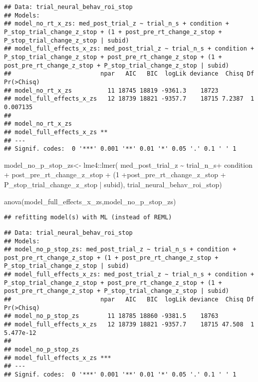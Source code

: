 \documentclass[
]{article}
\newenvironment{Shaded}{\begin{snugshade}}{\end{snugshade}}
\newcommand{\DecValTok}[1]{\textcolor[rgb]{0.00,0.00,0.81}{#1}}
\newcommand{\FunctionTok}[1]{\textcolor[rgb]{0.00,0.00,0.00}{#1}}
\newcommand{\NormalTok}[1]{#1}
\newcommand{\OtherTok}[1]{\textcolor[rgb]{0.56,0.35,0.01}{#1}}
\newcommand{\SpecialCharTok}[1]{\textcolor[rgb]{0.00,0.00,0.00}{#1}}
\begin{document}
\begin{verbatim}
## Data: trial_neural_behav_roi_stop
## Models:
## model_no_rt_x_zs: med_post_trial_z ~ trial_n_s + condition + P_stop_trial_change_z_stop + (1 + post_pre_rt_change_z_stop + P_stop_trial_change_z_stop | subid)
## model_full_effects_x_zs: med_post_trial_z ~ trial_n_s + condition + P_stop_trial_change_z_stop + post_pre_rt_change_z_stop + (1 + post_pre_rt_change_z_stop + P_stop_trial_change_z_stop | subid)
##                         npar   AIC   BIC  logLik deviance  Chisq Df Pr(>Chisq)
## model_no_rt_x_zs          11 18745 18819 -9361.3    18723                     
## model_full_effects_x_zs   12 18739 18821 -9357.7    18715 7.2387  1   0.007135
##                           
## model_no_rt_x_zs          
## model_full_effects_x_zs **
## ---
## Signif. codes:  0 '***' 0.001 '**' 0.01 '*' 0.05 '.' 0.1 ' ' 1
\end{verbatim}

\begin{Shaded}
\begin{Highlighting}[]
\NormalTok{model\_no\_p\_stop\_zs}\OtherTok{\textless{}{-}}\NormalTok{ lme4}\SpecialCharTok{::}\FunctionTok{lmer}\NormalTok{(}
\NormalTok{   med\_post\_trial\_z }\SpecialCharTok{\textasciitilde{}}\NormalTok{ trial\_n\_s}\SpecialCharTok{+}\NormalTok{ condition }\SpecialCharTok{+}\NormalTok{ post\_pre\_rt\_change\_z\_stop }\SpecialCharTok{+}\NormalTok{ (}\DecValTok{1} \SpecialCharTok{+}\NormalTok{post\_pre\_rt\_change\_z\_stop  }\SpecialCharTok{+}\NormalTok{ P\_stop\_trial\_change\_z\_stop  }\SpecialCharTok{|}\NormalTok{ subid),}
\NormalTok{  trial\_neural\_behav\_roi\_stop)}

\FunctionTok{anova}\NormalTok{(model\_full\_effects\_x\_zs,model\_no\_p\_stop\_zs)}
\end{Highlighting}
\end{Shaded}

\begin{verbatim}
## refitting model(s) with ML (instead of REML)
\end{verbatim}

\begin{verbatim}
## Data: trial_neural_behav_roi_stop
## Models:
## model_no_p_stop_zs: med_post_trial_z ~ trial_n_s + condition + post_pre_rt_change_z_stop + (1 + post_pre_rt_change_z_stop + P_stop_trial_change_z_stop | subid)
## model_full_effects_x_zs: med_post_trial_z ~ trial_n_s + condition + P_stop_trial_change_z_stop + post_pre_rt_change_z_stop + (1 + post_pre_rt_change_z_stop + P_stop_trial_change_z_stop | subid)
##                         npar   AIC   BIC  logLik deviance  Chisq Df Pr(>Chisq)
## model_no_p_stop_zs        11 18785 18860 -9381.5    18763                     
## model_full_effects_x_zs   12 18739 18821 -9357.7    18715 47.508  1  5.477e-12
##                            
## model_no_p_stop_zs         
## model_full_effects_x_zs ***
## ---
## Signif. codes:  0 '***' 0.001 '**' 0.01 '*' 0.05 '.' 0.1 ' ' 1
\end{verbatim}
\end{document}
